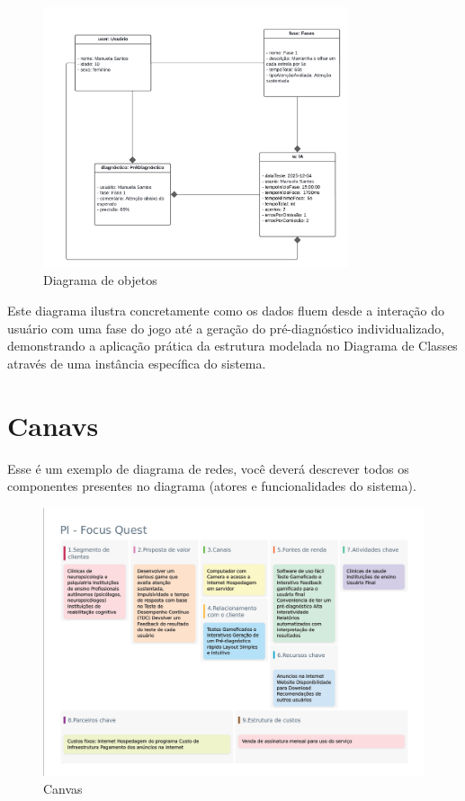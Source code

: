 \documentclass[
  a4paper,%
  12pt,%
  english,%
  brazilian,%
]{article}
\begin{document}
    \begin{figure}[H]
\centering
\caption{Diagrama de objetos}%
\label{fig:diagrama-de-objetos}
\includegraphics[width=0.8\textwidth]{Logos/diagrama-de-objetos.png}
\end{figure}

    Este diagrama ilustra concretamente como os dados fluem desde a interação do usuário com uma fase do jogo até a geração do pré-diagnóstico individualizado, demonstrando a aplicação prática da estrutura modelada no Diagrama de Classes através de uma instância específica do sistema.


\section*{Canavs}
    
    Esse é um exemplo de diagrama de redes, você deverá descrever todos os componentes presentes no diagrama (atores e funcionalidades do sistema).

\begin{figure}[H]
\centering
\caption{Canvas}%
\label{fig:canvas}
\includegraphics[width=1.1\textwidth]{Logos/canvas.png}
\end{figure}
\end{document}
